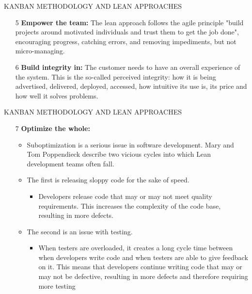 \documentclass{beamer}
\begin{document}
\begin{frame}{KANBAN METHODOLOGY AND LEAN APPROACHES}
	\begin{itemize}
		\item[5] \textbf{Empower the team: }The lean approach follows the agile principle
	 "build projects around motivated 
		individuals and trust them to get the job done",
	 encouraging progress, catching errors, and 
		removing impediments, but not micro-managing.
		\item[6] \textbf{Build integrity in: }The customer needs to have an overall experience of the system. This is the so-called 
		perceived integrity: how it is being advertised, delivered, deployed, accessed, how intuitive its use is, its 
		price and how well it solves problems.

	\end{itemize}
\end{frame}
\begin{frame}{KANBAN METHODOLOGY AND LEAN APPROACHES}
	\begin{itemize}
		\item[7] \textbf{Optimize the whole:}
		\begin{itemize}
			\item Suboptimization is a serious issue in software development. Mary and Tom 
			Poppendieck describe two vicious cycles into which Lean development teams 
			often fall.

			\item The first is releasing sloppy code for the sake of speed.
			\begin{itemize}
				\item Developers release code that may or may not meet quality requirements. This 
				increases the complexity of the code base, resulting in more defects.
			\end{itemize}
		\item The second is an issue with testing.
        \begin{itemize}
        	\item When testers are overloaded, it creates a long cycle time between when developers 
        	write code and when testers are able to give feedback on it. This means that 
        	developers continue writing code that may or may not be defective, resulting in 
        	more defects and therefore requiring more testing
        \end{itemize}
		\end{itemize}
	\end{itemize}
\end{frame}
\end{document}
